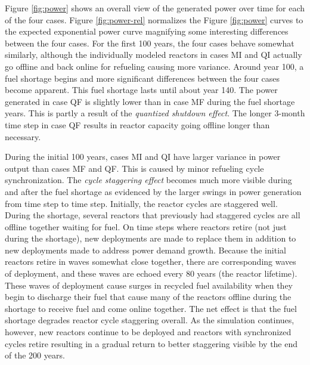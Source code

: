 \documentclass{style}
\begin{document}
Figure \ref{fig:power} shows an overall view of the generated power over time
for each of the four cases.  Figure \ref{fig:power-rel} normalizes the Figure
\ref{fig:power} curves to the expected exponential power curve magnifying some
interesting differences between the four cases.  For the first 100 years, the
four cases behave somewhat similarly, although the individually modeled
reactors in cases MI and QI actually go offline and back online for refueling
causing more variance.  Around year 100, a fuel shortage begins and more
significant differences between the four cases become apparent. This fuel
shortage lasts until about year 140. The power generated in case QF is slightly
lower than in case MF during the fuel shortage years. This is partly a result of
the \emph{quantized shutdown effect}.  The longer 3-month time step in case QF 
results in reactor capacity going offline longer than necessary.

During the initial 100 years, cases MI and QI have larger variance in power
output than cases MF and QF.  This is caused by minor refueling cycle
synchronization.  The \emph{cycle staggering effect} becomes much more visible
during and after the fuel shortage as evidenced by the larger swings in power
generation from time step to time step.  Initially, the reactor cycles are
staggered well.  During the shortage, several reactors that previously had
staggered cycles are all offline together waiting for fuel.  On time steps
where reactors retire (not just during the shortage), new deployments are made
to replace them in addition to new deployments made to address power demand
growth.  Because the initial reactors retire in waves somewhat close together,
there are corresponding waves of deployment, and these waves are echoed every
80 years (the reactor lifetime).  These waves of deployment cause surges in
recycled fuel availability when they begin to discharge their fuel
that cause many of the reactors offline during the
shortage to receive fuel and come online together.  The net effect is that the
fuel shortage degrades reactor cycle staggering overall.  As the simulation
continues, however, new reactors continue to be deployed and reactors with
synchronized cycles retire resulting in a gradual return to better
staggering visible by the end of the 200 years.
\end{document}
